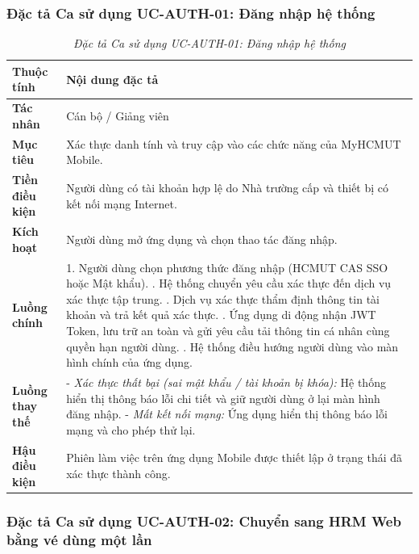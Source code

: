 \subsubsection{Đặc tả Ca sử dụng UC-AUTH-01: Đăng nhập hệ thống}

\begin{table}[H]
\centering
\renewcommand{\arraystretch}{1.25}
\begin{tabularx}{\textwidth}{|p{3.2cm}|X|}
\hline
\textbf{Thuộc tính} & \textbf{Nội dung đặc tả} \\
\hline
\textbf{Tác nhân} & Cán bộ / Giảng viên \\
\hline
\textbf{Mục tiêu} & Xác thực danh tính và truy cập vào các chức năng của MyHCMUT Mobile. \\
\hline
\textbf{Tiền điều kiện} & Người dùng có tài khoản hợp lệ do Nhà trường cấp và thiết bị có kết nối mạng Internet. \\
\hline
\textbf{Kích hoạt} & Người dùng mở ứng dụng và chọn thao tác đăng nhập. \\
\hline
\textbf{Luồng chính} & 
1. Người dùng chọn phương thức đăng nhập (HCMUT CAS SSO hoặc Mật khẩu). \newline
2. Hệ thống chuyển yêu cầu xác thực đến dịch vụ xác thực tập trung. \newline
3. Dịch vụ xác thực thẩm định thông tin tài khoản và trả kết quả xác thực. \newline
4. Ứng dụng di động nhận JWT Token, lưu trữ an toàn và gửi yêu cầu tải thông tin cá nhân cùng quyền hạn người dùng. \newline
5. Hệ thống điều hướng người dùng vào màn hình chính của ứng dụng. \\
\hline
\textbf{Luồng thay thế} & 
- \textit{Xác thực thất bại (sai mật khẩu / tài khoản bị khóa):} Hệ thống hiển thị thông báo lỗi chi tiết và giữ người dùng ở lại màn hình đăng nhập. \newline
- \textit{Mất kết nối mạng:} Ứng dụng hiển thị thông báo lỗi mạng và cho phép thử lại. \\
\hline
\textbf{Hậu điều kiện} & Phiên làm việc trên ứng dụng Mobile được thiết lập ở trạng thái đã xác thực thành công. \\
\hline
\end{tabularx}
\caption{\textit{Đặc tả Ca sử dụng UC-AUTH-01: Đăng nhập hệ thống}}
\label{tab:uc_auth_01}
\end{table}

\subsubsection{Đặc tả Ca sử dụng UC-AUTH-02: Chuyển sang HRM Web bằng vé dùng một lần}

